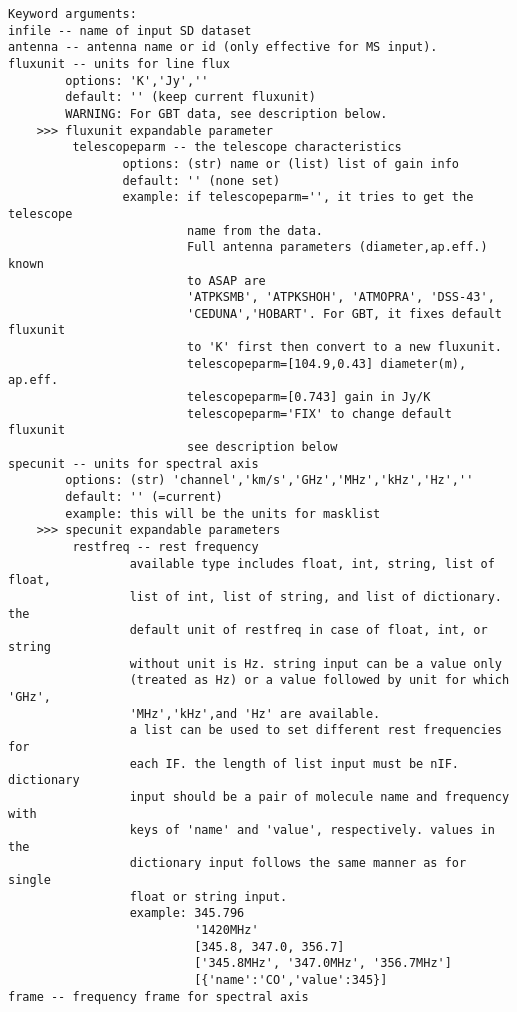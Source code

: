 \begin{verbatim}
Keyword arguments:
infile -- name of input SD dataset
antenna -- antenna name or id (only effective for MS input). 
fluxunit -- units for line flux
        options: 'K','Jy',''
        default: '' (keep current fluxunit)
        WARNING: For GBT data, see description below.
    >>> fluxunit expandable parameter
         telescopeparm -- the telescope characteristics
                options: (str) name or (list) list of gain info
                default: '' (none set)
                example: if telescopeparm='', it tries to get the telescope
                         name from the data.
                         Full antenna parameters (diameter,ap.eff.) known
                         to ASAP are
                         'ATPKSMB', 'ATPKSHOH', 'ATMOPRA', 'DSS-43',
                         'CEDUNA','HOBART'. For GBT, it fixes default fluxunit
                         to 'K' first then convert to a new fluxunit.
                         telescopeparm=[104.9,0.43] diameter(m), ap.eff.
                         telescopeparm=[0.743] gain in Jy/K
                         telescopeparm='FIX' to change default fluxunit
                         see description below
specunit -- units for spectral axis
        options: (str) 'channel','km/s','GHz','MHz','kHz','Hz',''
        default: '' (=current)
        example: this will be the units for masklist
    >>> specunit expandable parameters
         restfreq -- rest frequency
                 available type includes float, int, string, list of float, 
                 list of int, list of string, and list of dictionary. the 
                 default unit of restfreq in case of float, int, or string 
                 without unit is Hz. string input can be a value only 
                 (treated as Hz) or a value followed by unit for which 'GHz',
                 'MHz','kHz',and 'Hz' are available. 
                 a list can be used to set different rest frequencies for 
                 each IF. the length of list input must be nIF. dictionary 
                 input should be a pair of molecule name and frequency with 
                 keys of 'name' and 'value', respectively. values in the 
                 dictionary input follows the same manner as for single 
                 float or string input. 
                 example: 345.796
                          '1420MHz'
                          [345.8, 347.0, 356.7]
                          ['345.8MHz', '347.0MHz', '356.7MHz']
                          [{'name':'CO','value':345}]
frame -- frequency frame for spectral axis

\end{verbatim}
